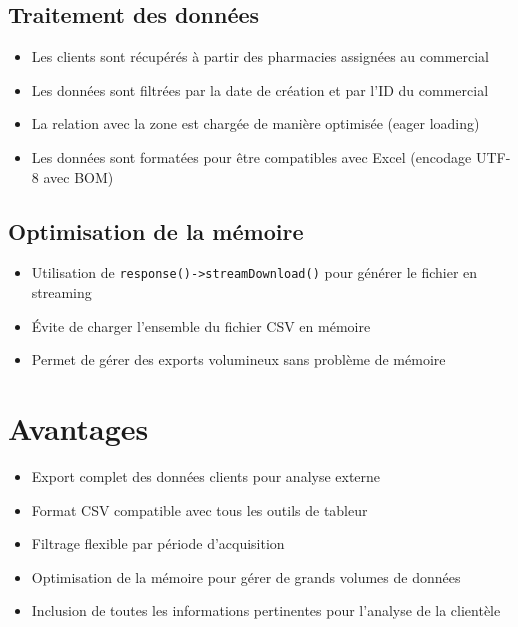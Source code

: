 \documentclass[12pt,a4paper]{article}
\begin{document}
\subsection{Traitement des données}
\begin{itemize}
    \item Les clients sont récupérés à partir des pharmacies assignées au commercial
    \item Les données sont filtrées par la date de création et par l'ID du commercial
    \item La relation avec la zone est chargée de manière optimisée (eager loading)
    \item Les données sont formatées pour être compatibles avec Excel (encodage UTF-8 avec BOM)
\end{itemize}

\subsection{Optimisation de la mémoire}
\begin{itemize}
    \item Utilisation de \texttt{response()->streamDownload()} pour générer le fichier en streaming
    \item Évite de charger l'ensemble du fichier CSV en mémoire
    \item Permet de gérer des exports volumineux sans problème de mémoire
\end{itemize}

\section{Avantages}
\begin{itemize}
    \item Export complet des données clients pour analyse externe
    \item Format CSV compatible avec tous les outils de tableur
    \item Filtrage flexible par période d'acquisition
    \item Optimisation de la mémoire pour gérer de grands volumes de données
    \item Inclusion de toutes les informations pertinentes pour l'analyse de la clientèle
\end{itemize}
\end{document}
